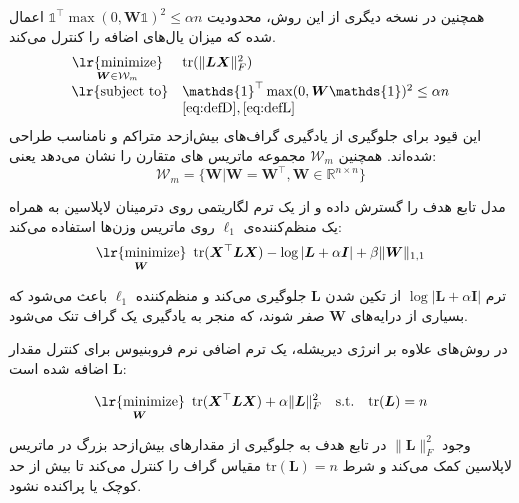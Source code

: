 \documentclass[12pt,onecolumn,a4paper]{article}
\newcommand\minimize[1]{\mathop{\text{\lr{minimize}}}\limits_{#1}\ }
\begin{document}
     همچنین در نسخه دیگری از این روش، محدودیت \( \mathds{1}^\top \max(0, \bm{W} \mathds{1})^2 \leq \alpha n \) اعمال شده که میزان یال‌های اضافه را کنترل می‌کند. 
      \begin{equation}
     	\begin{array}{cl}
     		\minimize{\bm{W}\in\mathcal{W}_m} & \text{tr}(\|\bm{L} \bm{X}\|^2_F) \\
     		\text{\lr{subject to}} & \mathds{1}^\top \max(0, \bm{W} \mathds{1})^2 \leq \alpha n  \\
     		& \eqref{eq:defD}, \eqref{eq:defL}
     	\end{array}
     \end{equation}
     این قیود برای جلوگیری از یادگیری گراف‌های بیش‌ازحد متراکم و نامناسب طراحی شده‌اند. همچنین 
     $\mathcal{W}_m$
     مجموعه ماتریس های متقارن را نشان می‌دهد یعنی:
     \begin{equation}
     	  \mathcal{W}_m = \big\{\bm{W} | \bm{W} = \bm{W}^\top, \bm{W} \in \mathds{R}^{n\times n}\big\}
     \end{equation}
     
     مدل \cite{Lake2010DiscoveringSB} تابع هدف را گسترش داده و از یک ترم لگاریتمی روی دترمینان لاپلاسین به همراه یک منظم‌کننده‌ی \( \ell_1 \) روی ماتریس وزن‌ها استفاده می‌کند:
     \begin{equation}
     	     \minimize{\bm{W}} \text{tr} (\bm{X}^\top \bm{L} \bm{X}) - \log | \bm{L} + \alpha \bm{I} | + \beta \| \bm{W} \|_{1,1}
     \end{equation}
     
     ترم \( \log | \bm{L} + \alpha \bm{I} | \) از تکین شدن \( \bm{L} \) جلوگیری می‌کند و منظم‌کننده \( \ell_1 \) باعث می‌شود که بسیاری از درایه‌های \( \bm{W} \) صفر شوند، که منجر به یادگیری یک گراف تنک می‌شود.
     
     در روش‌های
     \cite{Hu2015,Dong2016}
      علاوه بر انرژی دیریشله، یک ترم اضافی نرم فروبنیوس برای کنترل مقدار \( \bm{L} \) اضافه شده است:
     
     \begin{equation}
     	     \minimize{\bm{W}} \text{tr} (\bm{X}^\top \bm{L} \bm{X}) + \alpha \|\bm{L}\|_F^2 \quad \text{s.t.} \quad \text{tr}(\bm{L}) = n
     \end{equation}
     
     وجود \( \|\bm{L}\|_F^2 \) در تابع هدف به جلوگیری از مقدارهای بیش‌ازحد بزرگ در ماتریس لاپلاسین کمک می‌کند و شرط \( \text{tr}(\bm{L}) = n \) مقیاس گراف را کنترل می‌کند تا بیش از حد کوچک یا پراکنده نشود.
     
\end{document}
